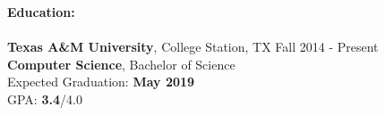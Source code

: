 \documentclass[12pt]{article}
\begin{document}
\begin{flushleft}
    \begin{outline}[compactitem]

        \newlength{\upspacelength}
        \setlength{\upspacelength}{-0.6px}
        \newcommand{\upspace}{\vspace{\upspacelength}}
        \newcommand{\zzz}[1]{\upspace \0 \textbf{#1} \\ \vspace{-0.8\baselineskip} \hrulefill \vspace{-2px} \\ }
        \let\oldOne\1\let\oldTwo\2\let\oldThree\3\let\oldFour\4
        \renewcommand{\1}{\upspace \oldOne  }
        \renewcommand{\2}{\upspace \oldTwo  }
        \renewcommand{\3}{\upspace \oldThree}
        \renewcommand{\4}{\upspace \oldFour }



        \zzz{Education:}
        \1 \textbf{Texas A\&M University}, College Station, TX \hfill Fall 2014 - Present
        \\ \textbf{Computer Science}, Bachelor of Science
        \\ Expected Graduation: \textbf{May 2019}
        \\ GPA\@:  \textbf{3.4}/4.0


\end{outline}
\end{flushleft}
\end{document}
